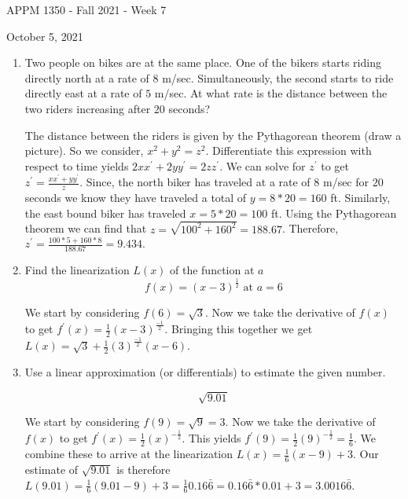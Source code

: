\documentclass{article}
\begin{document}
\begin{center}
	{\Large APPM 1350 - Fall 2021 - Week 7}
	
	{\large October 5, 2021}
\end{center}

\begin{enumerate}[label = \arabic*)]
    \item Two people on bikes are at the same place. One of the bikers starts riding directly north at a rate of $8$ m/sec. Simultaneously, the second starts to ride directly east at a rate of $5$ m/sec. At what rate is the distance between the two riders increasing after $20$ seconds?
    
    
    The distance between the riders is given by the Pythagorean theorem (draw a picture). So we consider, $x^2 + y^2 = z^2.$ Differentiate this expression with respect to time yields $2x x^\prime + 2y y^\prime  = 2z z^\prime .$ We can solve for $z^\prime $ to get  $z^\prime  = \frac{ x x^\prime + y y^\prime}{z}.$ Since, the north biker has traveled  at a rate of $8$ m/sec for $20$ seconds we know they have traveled a total of $y = 8 * 20 = 160$ ft. Similarly, the east bound biker has traveled $x = 5 * 20 = 100$ ft. Using the Pythagorean theorem we can find that $z = \sqrt{100^2 + 160^2}=188.67$. Therefore, $z^\prime  = \frac{ 100 * 5 + 160 * 8}{188.67} = 9.434.$
    
    
    
    \item Find the linearization $L(x)$ of the function at $a$
    \[
    	f(x) =  (x-3)^\frac{1}{2} \text{ at } a = 6
    \]
        
        We start by considering $f(6) = \sqrt{3}.$ Now we take the derivative of $f(x)$ to get $f^\prime(x) = \frac{1}{2}(x-3)^\frac{-1}{2}.$ Bringing this together we get $L(x) = \sqrt{3} + \frac{1}{2}(3)^\frac{-1}{2}(x-6).$ 
    
		\item  Use a linear approximation (or differentials) to estimate the given number.
	
	    \[
	    	\sqrt{9.01}
	    \]
	    
	    We start by considering $f(9) = \sqrt{9} = 3.$ Now we take the derivative of $f(x)$ to get $f^\prime(x) = \frac{1}{2}(x)^{-\frac{1}{2}}.$ This yields $f^\prime(9) = \frac{1}{2}(9)^{-\frac{1}{2}} = \frac{1}{6}.$ We combine these to arrive at the linearization $L(x) = \frac{1}{6}(x - 9) + 3$. Our estimate of $\sqrt{9.01}$ is therefore $L(9.01) = \frac{1}{6}(9.01 - 9) + 3 = \frac{1}{6}0.16\bar{6} = 0.16\bar{6} * 0.01 + 3 = 3.0016\bar{6}$.	
	

\end{enumerate}
\end{document}
